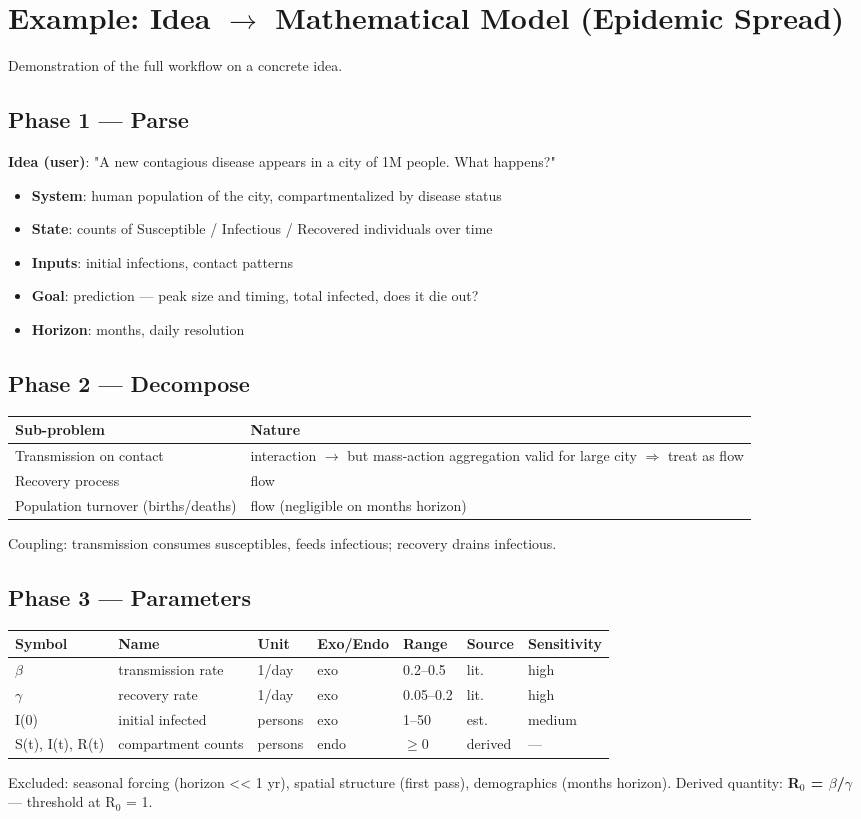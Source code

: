 \documentclass[11pt]{article}
\begin{document}
\section*{Example: Idea $\to$ Mathematical Model (Epidemic Spread)}
Demonstration of the full workflow on a concrete idea.\\
\subsection*{Phase 1 --- Parse}
\textbf{Idea (user)}: "A new contagious disease appears in a city of 1M people. What happens?"\\
\begin{itemize}
  \item \textbf{System}: human population of the city, compartmentalized by disease status
  \item \textbf{State}: counts of Susceptible / Infectious / Recovered individuals over time
  \item \textbf{Inputs}: initial infections, contact patterns
  \item \textbf{Goal}: prediction --- peak size and timing, total infected, does it die out?
  \item \textbf{Horizon}: months, daily resolution
\end{itemize}
\subsection*{Phase 2 --- Decompose}
\begin{tabular}{ll}
\toprule
Sub-problem & Nature \\
\midrule
Transmission on contact & interaction $\to$ but mass-action aggregation valid for large city $\Rightarrow$ treat as flow \\
Recovery process & flow \\
Population turnover (births/deaths) & flow (negligible on months horizon) \\
\bottomrule
\end{tabular}
Coupling: transmission consumes susceptibles, feeds infectious; recovery drains infectious.\\
\subsection*{Phase 3 --- Parameters}
\begin{tabular}{lllllll}
\toprule
Symbol & Name & Unit & Exo/Endo & Range & Source & Sensitivity \\
\midrule
$\beta$ & transmission rate & 1/day & exo & 0.2--0.5 & lit. & high \\
$\gamma$ & recovery rate & 1/day & exo & 0.05--0.2 & lit. & high \\
I(0) & initial infected & persons & exo & 1--50 & est. & medium \\
S(t), I(t), R(t) & compartment counts & persons & endo & $\geq$0 & derived & --- \\
\bottomrule
\end{tabular}
Excluded: seasonal forcing (horizon << 1 yr), spatial structure (first pass), demographics (months horizon). Derived quantity: \textbf{R$_{0}$ = $\beta$/$\gamma$} --- threshold at R$_{0}$ = 1.\\
\end{document}
